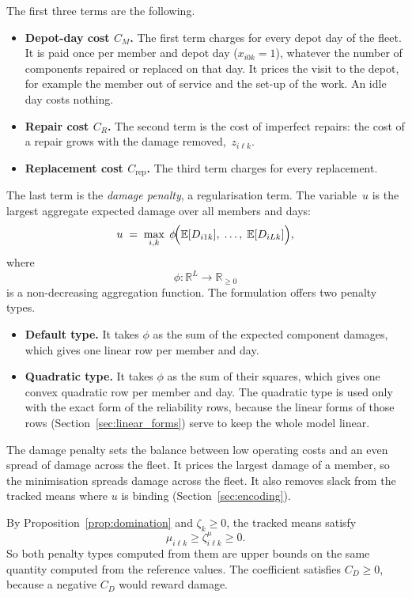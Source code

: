 \documentclass[11pt,a4paper]{article}
\theoremstyle{plain}
\theoremstyle{definition}
\theoremstyle{remark}
\begin{document}
The first three terms are the following.
\begin{itemize}
  \item \textbf{Depot-day cost $C_M$.} The first term charges for every depot day of the fleet.
    It is paid once per member and depot day ($x_{i0k} = 1$), whatever the number of components repaired or replaced on that day.
    It prices the visit to the depot, for example the member out of service and the set-up of the work.
    An idle day costs nothing.
  \item \textbf{Repair cost $C_R$.} The second term is the cost of imperfect repairs: the cost of a repair grows with the damage removed,~$z_{i\ell k}$.
  \item \textbf{Replacement cost $C_{\mathrm{rep}}$.} The third term charges for every replacement.
\end{itemize}

The last term is the \emph{damage penalty}, a regularisation term.
The variable~$u$ is the largest aggregate expected damage over all members and days:
\begin{equation}\label{eq:u_def}
  u \;=\; \max_{i,k}\; \phi\!\Bigl(\mathbb{E}[D_{i1k}],\;\ldots,\;\mathbb{E}[D_{iLk}]\Bigr),
\end{equation}
where
\begin{equation}
  \phi\colon \mathbb{R}^L \to \mathbb{R}_{\ge 0}
\end{equation}
is a non-decreasing aggregation function.
The formulation offers two penalty types.
\begin{itemize}
  \item \textbf{Default type.} It takes $\phi$ as the sum of the expected component damages, which gives one linear row per member and day.
  \item \textbf{Quadratic type.} It takes $\phi$ as the sum of their squares, which gives one convex quadratic row per member and day.
    The quadratic type is used only with the exact form of the reliability rows, because the linear forms of those rows (Section~\ref{sec:linear_forms}) serve to keep the whole model linear.
\end{itemize}

The damage penalty sets the balance between low operating costs and an even spread of damage across the fleet.
It prices the largest damage of a member, so the minimisation spreads damage across the fleet.
It also removes slack from the tracked means where $u$ is binding (Section~\ref{sec:encoding}).

By Proposition~\ref{prop:domination} and $\zeta_k \ge 0$, the tracked means satisfy
\begin{equation}
  \mu_{i\ell k} \ge \zeta^{\mu}_{i\ell k} \ge 0.
\end{equation}
So both penalty types computed from them are upper bounds on the same quantity computed from the reference values.
The coefficient satisfies $C_D \ge 0$, because a negative $C_D$ would reward damage.
\end{document}
